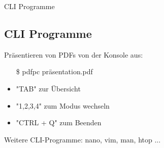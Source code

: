 \begin{frame}{CLI Programme}
    \subsection{CLI Programme}\label{subsec:cli-programme}

    Präsentieren von PDFs von der Konsole aus:

    \begin{itemize}
        \item[\$] pdfpc präsentation.pdf
        \item "TAB" zur Übersicht
        \item "1,2,3,4" zum Modus wechseln
        \item "CTRL + Q" zum Beenden
    \end{itemize}

    Weitere CLI-Programme: nano, vim, man, htop ...

\end{frame}

